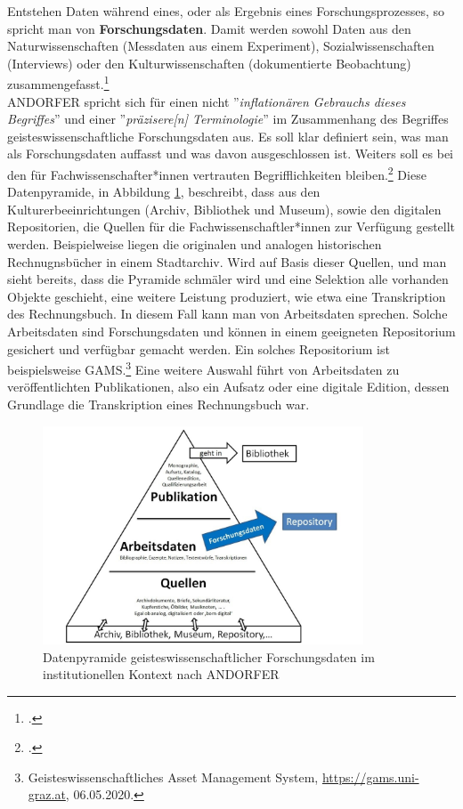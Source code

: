 \documentclass[12pt,a4paper]{article}
\begin{document}
Entstehen Daten während eines, oder als Ergebnis eines Forschungsprozesses, so spricht man von \textbf{Forschungsdaten}. Damit werden sowohl Daten aus den Naturwissenschaften (Messdaten aus einem Experiment), Sozialwissenschaften (Interviews) oder den Kulturwissenschaften (dokumentierte Beobachtung) zusammengefasst.\footcite[][09.06.2019]{kindling2013forschungsdatenmanagement}
\\
ANDORFER spricht sich für einen nicht ''\textit{inflationären Gebrauchs dieses Begriffes}'' und einer ''\textit{präzisere[n] Terminologie}'' im Zusammenhang des Begriffes geisteswissenschaftliche Forschungsdaten aus. Es soll klar definiert sein, was man als Forschungsdaten auffasst und was davon ausgeschlossen ist. Weiters soll es bei den für Fachwissenschafter*innen vertrauten Begrifflichkeiten bleiben.\footcite[][]{andorfer2015forschungsdaten}
Diese Datenpyramide, in Abbildung \ref{fig:forschungsdaten}, beschreibt, dass aus den Kulturerbeeinrichtungen (Archiv, Bibliothek und Museum), sowie den digitalen Repositorien, die Quellen für die Fachwissenschaftler*innen zur Verfügung gestellt werden. Beispielweise liegen die originalen und analogen historischen Rechnugnsbücher in einem Stadtarchiv. Wird auf Basis dieser Quellen, und man sieht bereits, dass die Pyramide schmäler wird und eine Selektion alle vorhanden Objekte geschieht, eine weitere Leistung produziert, wie etwa eine Transkription des Rechnungsbuch. In diesem Fall kann man von Arbeitsdaten sprechen. Solche Arbeitsdaten sind Forschungsdaten und können in einem geeigneten Repositorium gesichert und verfügbar gemacht werden. Ein solches Repositorium ist beispielsweise GAMS.\footnote{Geisteswissenschaftliches Asset Management System, \url{https://gams.uni-graz.at}, 06.05.2020.} Eine weitere Auswahl führt von Arbeitsdaten zu veröffentlichten Publikationen, also ein Aufsatz oder eine digitale Edition, dessen Grundlage die Transkription eines Rechnungsbuch war.
\begin{figure}[H]
\centering
	\includegraphics[width=0.85\textwidth]{img/forschungsdaten.png}  
    \caption[Datenpyramide geisteswissenschaftlicher Forschungsdaten im institutionellen Kontext, ANDORFER, Peter: Forschungsdaten in den (digitalen) Geisteswissenschaften: Versuch einer Konkretisierung, 2015, S.14]{Datenpyramide geisteswissenschaftlicher Forschungsdaten im institutionellen Kontext nach ANDORFER} \label{fig:forschungsdaten}
\end{figure} 
\end{document}
